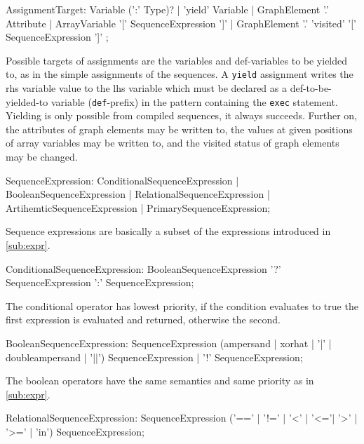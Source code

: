 \begin{rail}
  AssignmentTarget: 
    Variable (':' Type)? |
    'yield' Variable |
    GraphElement '.' Attribute |
    ArrayVariable '[' SequenceExpression ']' |
    GraphElement '.' 'visited' '[' SequenceExpression ']'
;
\end{rail}

Possible targets of assignments are the variables and def-variables to be yielded to, as in the simple assignments of the sequences. 
A \texttt{yield} assignment writes the rhs variable value to the lhs variable which must be declared as a  def-to-be-yielded-to variable (\texttt{def}-prefix) in the pattern containing the \texttt{exec} statement.
Yielding is only possible from compiled sequences, it always succeeds.
Further on, the attributes of graph elements may be written to, the values at given positions of array variables may be written to, and the visited status of graph elements may be changed.

\begin{rail}
  SequenceExpression:  
    ConditionalSequenceExpression |
    BooleanSequenceExpression |
    RelationalSequenceExpression |
    ArtihemticSequenceExpression |
    PrimarySequenceExpression;
\end{rail}

Sequence expressions are basically a subset of the expressions introduced in \ref{sub:expr}.

\begin{rail}
  ConditionalSequenceExpression: 
    BooleanSequenceExpression '?' SequenceExpression ':' SequenceExpression;
\end{rail}

The conditional operator has lowest priority, if the condition evaluates to true the first expression is evaluated and returned, otherwise the second.

\begin{rail}
  BooleanSequenceExpression: 
    SequenceExpression (ampersand | xorhat | '|' | doubleampersand | '||') SequenceExpression |
    '!' SequenceExpression;
\end{rail}

The boolean operators have the same semantics and same priority as in \ref{sub:expr}.

\begin{rail}
  RelationalSequenceExpression: 
    SequenceExpression ('==' | '!=' | '<' | '<='| '>' | '>=' | 'in') SequenceExpression;
\end{rail}

